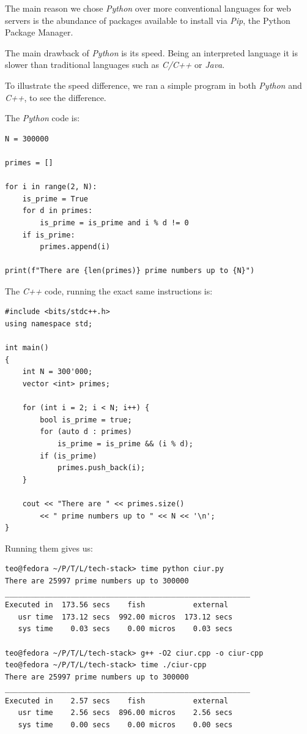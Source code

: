 \documentclass[12pt, a4paper]{report}
\begin{document}
The main reason we chose \textit{Python} over more conventional languages for web servers is the abundance of packages available to install via \textit{Pip}, the Python Package Manager.

The main drawback of \textit{Python} is its speed. Being an interpreted language it is slower than traditional languages such as \textit{C/C++} or \textit{Java}.

To illustrate the speed difference, we ran a simple program in both \textit{Python} and \textit{C++}, to see the difference.

The \textit{Python} code is:

\begin{verbatim}
N = 300000

primes = []

for i in range(2, N):
    is_prime = True
    for d in primes:
        is_prime = is_prime and i % d != 0
    if is_prime:
        primes.append(i)

print(f"There are {len(primes)} prime numbers up to {N}")
\end{verbatim}

The \textit{C++} code, running the exact same instructions is:
\begin{verbatim}
#include <bits/stdc++.h>
using namespace std;

int main()
{
    int N = 300'000;
    vector <int> primes;

    for (int i = 2; i < N; i++) {
        bool is_prime = true;
        for (auto d : primes)
            is_prime = is_prime && (i % d);
        if (is_prime)
            primes.push_back(i);
    }

    cout << "There are " << primes.size()
        << " prime numbers up to " << N << '\n';
}
\end{verbatim}

Running them gives us:
\begin{verbatim}
teo@fedora ~/P/T/L/tech-stack> time python ciur.py
There are 25997 prime numbers up to 300000
________________________________________________________
Executed in  173.56 secs    fish           external
   usr time  173.12 secs  992.00 micros  173.12 secs
   sys time    0.03 secs    0.00 micros    0.03 secs

teo@fedora ~/P/T/L/tech-stack> g++ -O2 ciur.cpp -o ciur-cpp
teo@fedora ~/P/T/L/tech-stack> time ./ciur-cpp
There are 25997 prime numbers up to 300000
________________________________________________________
Executed in    2.57 secs    fish           external
   usr time    2.56 secs  896.00 micros    2.56 secs
   sys time    0.00 secs    0.00 micros    0.00 secs
\end{verbatim}
\end{document}
